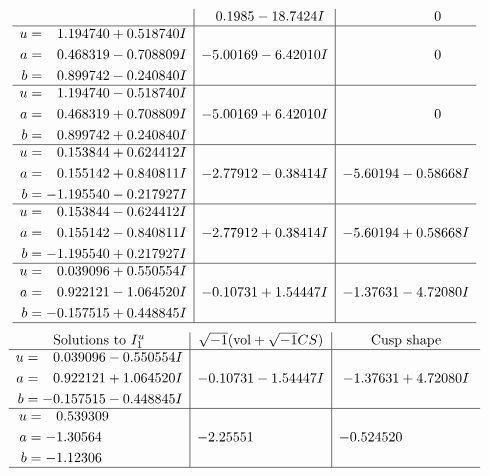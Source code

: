 \documentclass[1p]{elsarticle_modified}
\theoremstyle{definition}
\newcommand{\I}{\sqrt{-1}}
\begin{document}
$$\begin{array}{c|c|c}
 & \phantom{-}0.1985 - 18.7424 I & \phantom{-0.000000 } 0 \\ \hline\begin{aligned}
u &= \phantom{-}1.194740 + 0.518740 I \\
a &= \phantom{-}0.468319 - 0.708809 I \\
b &= \phantom{-}0.899742 - 0.240840 I\end{aligned}
 & -5.00169 - 6.42010 I & \phantom{-0.000000 } 0 \\ \hline\begin{aligned}
u &= \phantom{-}1.194740 - 0.518740 I \\
a &= \phantom{-}0.468319 + 0.708809 I \\
b &= \phantom{-}0.899742 + 0.240840 I\end{aligned}
 & -5.00169 + 6.42010 I & \phantom{-0.000000 } 0 \\ \hline\begin{aligned}
u &= \phantom{-}0.153844 + 0.624412 I \\
a &= \phantom{-}0.155142 + 0.840811 I \\
b &= -1.195540 - 0.217927 I\end{aligned}
 & -2.77912 - 0.38414 I & -5.60194 - 0.58668 I \\ \hline\begin{aligned}
u &= \phantom{-}0.153844 - 0.624412 I \\
a &= \phantom{-}0.155142 - 0.840811 I \\
b &= -1.195540 + 0.217927 I\end{aligned}
 & -2.77912 + 0.38414 I & -5.60194 + 0.58668 I \\ \hline\begin{aligned}
u &= \phantom{-}0.039096 + 0.550554 I \\
a &= \phantom{-}0.922121 - 1.064520 I \\
b &= -0.157515 + 0.448845 I\end{aligned}
 & -0.10731 + 1.54447 I & -1.37631 - 4.72080 I\\
 \hline 
 \end{array}$$\newpage$$\begin{array}{c|c|c}  
\text{Solutions to }I^u_{1}& \I (\text{vol} + \sqrt{-1}CS) & \text{Cusp shape}\\
 \hline 
\begin{aligned}
u &= \phantom{-}0.039096 - 0.550554 I \\
a &= \phantom{-}0.922121 + 1.064520 I \\
b &= -0.157515 - 0.448845 I\end{aligned}
 & -0.10731 - 1.54447 I & -1.37631 + 4.72080 I \\ \hline\begin{aligned}
u &= \phantom{-}0.539309\phantom{ +0.000000I} \\
a &= -1.30564\phantom{ +0.000000I} \\
b &= -1.12306\phantom{ +0.000000I}\end{aligned}
 & -2.25551\phantom{ +0.000000I} & -0.524520\phantom{ +0.000000I}\\
 \hline 
 \end{array}$$\newpage\newpage\renewcommand{\arraystretch}{1}
\end{document}
